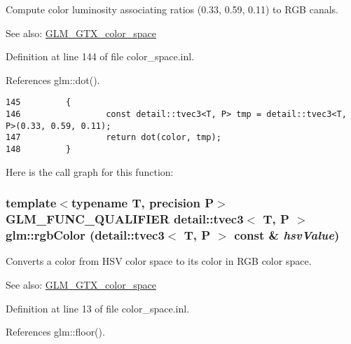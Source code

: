 Compute color luminosity associating ratios (0.33, 0.59, 0.11) to RGB canals. \begin{Desc}
\item[See also:]\hyperlink{group__gtx__color__space}{GLM\_\-GTX\_\-color\_\-space} \end{Desc}


Definition at line 144 of file color\_\-space.inl.

References glm::dot().

\begin{Code}\begin{verbatim}145         {
146                 const detail::tvec3<T, P> tmp = detail::tvec3<T, P>(0.33, 0.59, 0.11);
147                 return dot(color, tmp);
148         }
\end{verbatim}
\end{Code}




Here is the call graph for this function:\hypertarget{group__gtx__color__space_g35a9210371395c95b185f5aac6c0020e}{
\subsubsection[rgbColor]{\setlength{\rightskip}{0pt plus 5cm}template$<$typename T, precision P$>$ GLM\_\-FUNC\_\-QUALIFIER detail::tvec3$<$ T, P $>$ glm::rgbColor (detail::tvec3$<$ T, P $>$ const \& {\em hsvValue})}}
\label{group__gtx__color__space_g35a9210371395c95b185f5aac6c0020e}


Converts a color from HSV color space to its color in RGB color space. \begin{Desc}
\item[See also:]\hyperlink{group__gtx__color__space}{GLM\_\-GTX\_\-color\_\-space} \end{Desc}


Definition at line 13 of file color\_\-space.inl.

References glm::floor().

